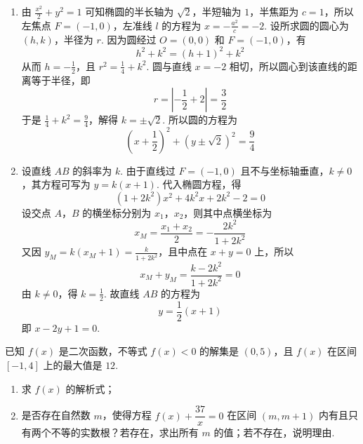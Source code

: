 \begin{solution}
\begin{enumerate}
\item 由 \(\frac{x^2}{2}+y^2=1\) 可知椭圆的半长轴为 \(\sqrt{2}\)，半短轴为 \(1\)，半焦距为 \(c=1\)，所以左焦点 \(F=(-1,0)\)，左准线 \(l\) 的方程为 \(x=-\frac{a^2}{c}=-2\). 设所求圆的圆心为 \((h,k)\)，半径为 \(r\). 因为圆经过 \(O=(0,0)\) 和 \(F=(-1,0)\)，有
\[
h^2+k^2=(h+1)^2+k^2
\]
从而 \(h=-\frac{1}{2}\)，且 \(r^2=\frac{1}{4}+k^2\). 圆与直线 \(x=-2\) 相切，所以圆心到该直线的距离等于半径，即
\[
r=\left|-\frac{1}{2}+2\right|=\frac{3}{2}
\]
于是 \(\frac{1}{4}+k^2=\frac{9}{4}\)，解得 \(k=\pm\sqrt{2}\). 所以圆的方程为
\[
\left(x+\frac{1}{2}\right)^2+\left(y\pm\sqrt{2}\right)^2=\frac{9}{4}
\]
\item 设直线 \(AB\) 的斜率为 \(k\). 由于直线过 \(F=(-1,0)\) 且不与坐标轴垂直，\(k\neq0\)，其方程可写为 \(y=k(x+1)\). 代入椭圆方程，得
\[
(1+2k^2)x^2+4k^2x+2k^2-2=0
\]
设交点 \(A\)，\(B\) 的横坐标分别为 \(x_1\)，\(x_2\)，则其中点横坐标为
\[
x_M=\frac{x_1+x_2}{2}=-\frac{2k^2}{1+2k^2}
\]
又因 \(y_M=k(x_M+1)=\frac{k}{1+2k^2}\)，且中点在 \(x+y=0\) 上，所以
\[
x_M+y_M=\frac{k-2k^2}{1+2k^2}=0
\]
由 \(k\neq0\)，得 \(k=\frac{1}{2}\). 故直线 \(AB\) 的方程为
\[
y=\frac{1}{2}(x+1)
\]
即 \(x-2y+1=0\).
\end{enumerate}
\end{solution}

\begin{problem}
已知 \(f(x)\) 是二次函数，不等式 \(f(x) < 0\) 的解集是 \((0,5)\)，且 \(f(x)\) 在区间 \([-1,4]\) 上的最大值是 \(12\).

\begin{enumerate}
\item 求 \(f(x)\) 的解析式；
\item 是否存在自然数 \(m\)，使得方程 \(f(x) + \dfrac{37}{x} = 0\) 在区间 \((m,m+1)\) 内有且只有两个不等的实数根？若存在，求出所有 \(m\) 的值；若不存在，说明理由.
\end{enumerate}
\end{problem}

